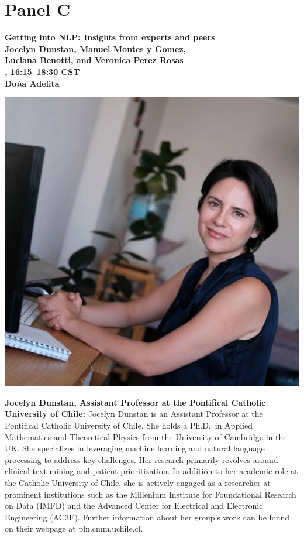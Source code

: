 \newpage
{}
\section{Panel C}

\begin{center}
{\bfseries\Large Getting into NLP: Insights from experts and peers } \\
\vspace{1.0em}
{\large\bf Jocelyn Dunstan, Manuel Montes y Gomez,\\\vspace{2.0\lineskip}Luciana Benotti, and Veronica Perez Rosas } \\

\textbf{\daydateyear{}, 16:15--18:30 CST}\\
\textbf{Do\~na Adelita}
\end{center}


\vspace{1em}
\begin{center}
\includegraphics[width=0.3\linewidth]{content/mexican_nlp/jocelyn.jpeg}
\end{center}
{\bfseries Jocelyn Dunstan, Assistant Professor at the Pontifical Catholic University of Chile:}
Jocelyn Dunstan is an Assistant Professor at the Pontifical Catholic University of Chile. She holds a Ph.D.~in Applied Mathematics and Theoretical Physics from the University of Cambridge in the UK. She specializes in leveraging machine learning and natural language processing to address key challenges. Her research primarily revolves around clinical text mining and patient prioritization. In addition to her academic role at the Catholic University of Chile, she is actively engaged as a researcher at prominent institutions such as the Millenium Institute for Foundational Research on Data (IMFD) and the Advanced Center for Electrical and Electronic Engineering (AC3E). Further information about her group's work can be found on their webpage at pln.cmm.uchile.cl.

